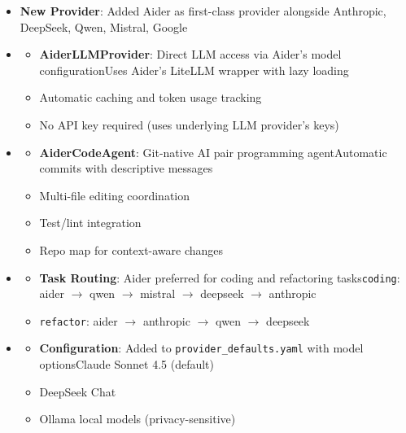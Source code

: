 \documentclass[12pt,a4paper]{article}
\begin{document}
\begin{itemize}
    \begin{itemize}
    \item \textbf{New Provider}: Added Aider as first-class provider alongside Anthropic, DeepSeek, Qwen, Mistral, Google
    \item 
    \begin{itemize}
    \item \textbf{AiderLLMProvider}: Direct LLM access via Aider's model configurationUses Aider's LiteLLM wrapper with lazy loading
    \item Automatic caching and token usage tracking
    \item No API key required (uses underlying LLM provider's keys)
\end{itemize}

    \item 
    \begin{itemize}
    \item \textbf{AiderCodeAgent}: Git-native AI pair programming agentAutomatic commits with descriptive messages
    \item Multi-file editing coordination
    \item Test/lint integration
    \item Repo map for context-aware changes
\end{itemize}

    \item 
    \begin{itemize}
    \item \textbf{Task Routing}: Aider preferred for coding and refactoring tasks\texttt{coding}: aider $\rightarrow$ qwen $\rightarrow$ mistral $\rightarrow$ deepseek $\rightarrow$ anthropic
    \item \texttt{refactor}: aider $\rightarrow$ anthropic $\rightarrow$ qwen $\rightarrow$ deepseek
\end{itemize}

    \item 
    \begin{itemize}
    \item \textbf{Configuration}: Added to \texttt{provider\_defaults.yaml} with model optionsClaude Sonnet 4.5 (default)
    \item DeepSeek Chat
    \item Ollama local models (privacy-sensitive)
\end{itemize}


\end{itemize}
\end{itemize}
\end{document}
